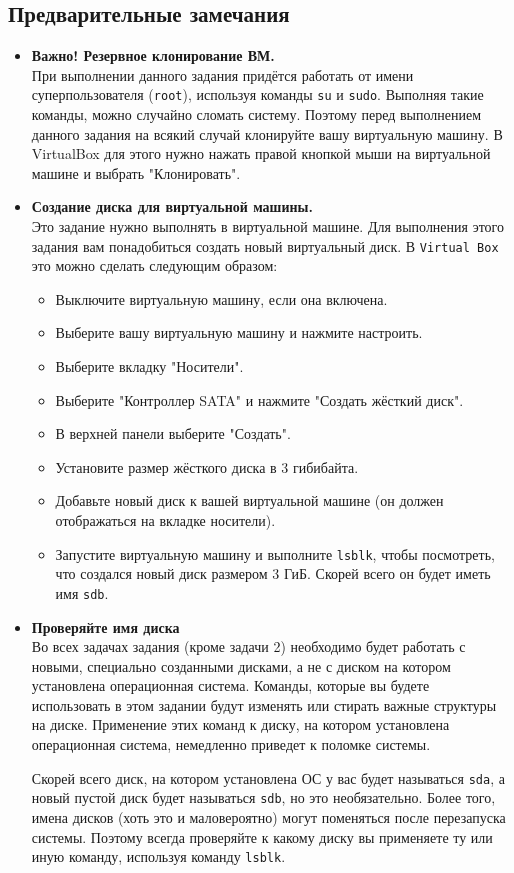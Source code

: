 \documentclass{article}
\begin{document}
\subsection*{Предварительные замечания}
\begin{itemize}
\item \textbf{Важно! Резервное клонирование ВМ.} \\
При выполнении данного задания придётся работать от имени суперпользователя (\texttt{root}), используя команды \texttt{su} и \texttt{sudo}. Выполняя такие команды, можно случайно сломать систему. Поэтому перед выполнением данного задания на всякий случай клонируйте вашу виртуальную машину. В VirtualBox для этого нужно нажать правой кнопкой мыши на виртуальной машине и выбрать "Клонировать".



\item \textbf{Создание диска для виртуальной машины.} \\
Это задание нужно выполнять в виртуальной машине. Для выполнения этого задания вам понадобиться создать новый виртуальный диск. В \texttt{Virtual Box} это можно сделать следующим образом:
\begin{itemize}
\item Выключите виртуальную машину, если она включена.
\item Выберите вашу виртуальную машину и нажмите настроить.
\item Выберите вкладку "Носители".
\item Выберите "Контроллер SATA"{} и нажмите "Создать жёсткий диск".
\item В верхней панели выберите "Создать".
\item Установите размер жёсткого диска в 3 гибибайта. 
\item Добавьте новый диск к вашей виртуальной машине (он должен отображаться на вкладке носители). 
\item Запустите виртуальную машину и выполните \texttt{lsblk}, чтобы посмотреть, что создался новый диск размером 3 ГиБ. Скорей всего он будет иметь имя \texttt{sdb}.
\end{itemize}


\item \textbf{Проверяйте имя диска} \\
Во всех задачах задания (кроме задачи 2) необходимо будет работать с новыми, специально созданными дисками, а не с диском на котором установлена операционная система. Команды, которые вы будете использовать в этом задании будут изменять или стирать важные структуры на диске. Применение этих команд к диску, на котором установлена операционная система, немедленно приведет к поломке системы.

Скорей всего диск, на котором установлена ОС у вас будет называться \texttt{sda}, а новый пустой диск будет называться \texttt{sdb}, но это необязательно. Более того, имена дисков (хоть это и маловероятно) могут поменяться после перезапуска системы. Поэтому всегда проверяйте к какому диску вы применяете ту или иную команду, используя команду \texttt{lsblk}.




\end{itemize}
\end{document}
